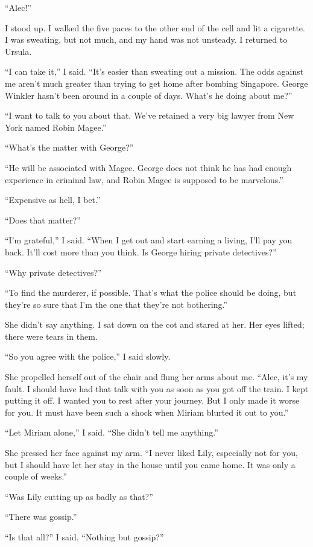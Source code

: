 \documentclass{novel}
\begin{document}
“Alec!”

I stood up. I walked the five paces to the other end of the cell and lit a cigarette. I was sweating, but not much, and my hand was not unsteady. I returned to Ursula.

“I can take it,” I said. “It’s easier than sweating out a mission. The odds against me aren’t much greater than trying to get home after bombing Singapore. George Winkler hasn’t been around in a couple of days. What’s he doing about me?”

“I want to talk to you about that. We’ve retained a very big lawyer from New York named Robin Magee.”

“What’s the matter with George?”

“He will be associated with Magee. George does not think he has had enough experience in criminal law, and Robin Magee is supposed to be marvelous.”

“Expensive as hell, I bet.”

“Does that matter?”

“I’m grateful,” I said. “When I get out and start earning a living, I’ll pay you back. It’ll cost more than you think. Is George hiring private detectives?”

“Why private detectives?”

“To find the murderer, if possible. That’s what the police should be doing, but they’re so sure that I’m the one that they’re not bothering.”

She didn’t say anything. I sat down on the cot and stared at her. Her eyes lifted; there were tears in them.

“So you agree with the police,” I said slowly.

She propelled herself out of the chair and flung her arms about me. “Alec, it’s my fault. I should have had that talk with you as soon as you got off the train. I kept putting it off. I wanted you to rest after your journey. But I only made it worse for you. It must have been such a shock when Miriam blurted it out to you.”

“Let Miriam alone,” I said. “She didn’t tell me anything.”

She pressed her face against my arm. “I never liked Lily, especially not for you, but I should have let her stay in the house until you came home. It was only a couple of weeks.”

“Was Lily cutting up as badly as that?”

“There was gossip.”

“Is that all?” I said. “Nothing but gossip?”
\end{document}
